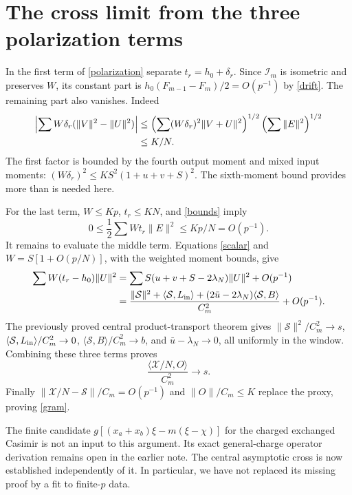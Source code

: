 \documentclass[11pt,a4paper]{article}
\newcommand{\Id}{\mathcal I}
\begin{document}
\newpage
\section{The cross limit from the three polarization terms}
In the first term of \eqref{polarization} separate $t_r=h_0+\delta_r$.
Since $\Id_m$ is isometric and preserves $W$, its constant part is
$h_0(F_{m-1}-F_m)/2=O(p^{-1})$ by \eqref{drift}.
The remaining part also vanishes. Indeed
\begin{align}
 \left|\sum W\delta_r(\|V\|^2-\|U\|^2)\right|
 &\le\left(\sum(W\delta_r)^2\|V+U\|^2\right)^{1/2}
          \left(\sum\|E\|^2\right)^{1/2}\notag\\
 &\le K/N.\label{firsterror}
\end{align}
The first factor is bounded by the fourth output moment and mixed
input moments: $(W\delta_r)^2\le KS^2(1+u+v+S)^2$.
The sixth-moment bound provides more than is needed here.

For the last term, $W\le Kp$, $t_r\le KN$, and \eqref{bounds} imply
\begin{equation}
 0\le\frac12\sum Wt_r\|E\|^2\le Kp/N=O(p^{-1}).
\end{equation}
It remains to evaluate the middle term. Equations \eqref{scalar}
and $W=S[1+O(p/N)]$, with the weighted moment bounds, give
\begin{align}
 \sum W(t_r-h_0)\|U\|^2
 &=\sum S(u+v+S-2\lambda_N)\|U\|^2+O(p^{-1})\notag\\
 &=\frac{\|\mathcal S\|^2+\langle\mathcal S,L_{\rm in}\rangle
       +(2\bar u-2\lambda_N)\langle\mathcal S,B\rangle}{C_m^2}
       +O(p^{-1}).\label{middle}
\end{align}
The previously proved central product-transport theorem gives
$\|\mathcal S\|^2/C_m^2\to s$,
$\langle\mathcal S,L_{\rm in}\rangle/C_m^2\to0$,
$\langle\mathcal S,B\rangle/C_m^2\to b$, and
$\bar u-\lambda_N\to0$, all uniformly in the window.
Combining these three terms proves
\begin{equation}
 \frac{\langle\mathcal X/N,O\rangle}{C_m^2}\longrightarrow s.
\end{equation}
Finally $\|\mathcal X/N-\mathcal S\|/C_m=O(p^{-1})$ and
$\|O\|/C_m\le K$ replace the proxy, proving \eqref{gram}.

The finite candidate
$g[(x_a+x_b)\xi-m(\xi-\chi)]$ for the charged exchanged
Casimir is not an input to this argument. Its exact general-charge
operator derivation remains open in the earlier note. The
central asymptotic cross is now established independently of it.
In particular, we have not replaced its missing proof by a fit to
finite-$p$ data.
\end{document}
